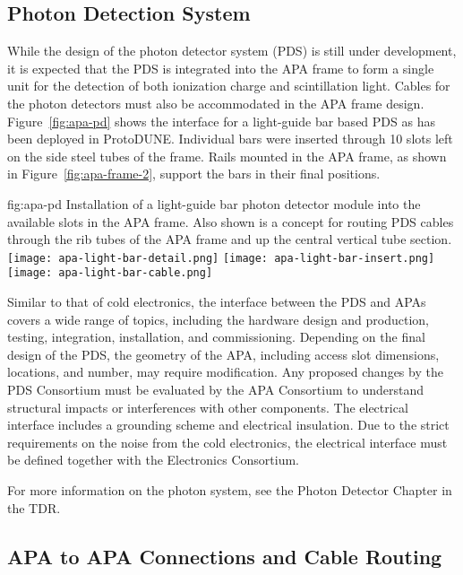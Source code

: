 \subsection{Photon Detection System}
\label{sec:fdsp-apa-intfc-pds}

While the design of the photon detector system (PDS) is still under development, it is expected that the PDS is integrated into the APA frame to form a single unit for the detection of both ionization charge and scintillation light.  Cables for the photon detectors must also be accommodated in the APA frame design.  Figure~\ref{fig:apa-pd} shows the interface for a light-guide bar based PDS as has been deployed in ProtoDUNE. Individual bars were inserted through 10 slots left on the side steel tubes of the frame. Rails mounted in the APA frame, as shown in Figure~\ref{fig:apa-frame-2}, support the bars in their final positions. 

\begin{dunefigure}{fig:apa-pd}
{Installation of a light-guide bar photon detector module into the available slots in the APA frame. Also shown is a concept for routing PDS cables through the rib tubes of the APA frame and up the central vertical tube section.}
\texttt{[image: apa-light-bar-detail.png]}\qquad\qquad
\texttt{[image: apa-light-bar-insert.png]}\qquad\qquad
\texttt{[image: apa-light-bar-cable.png]}
\end{dunefigure}

Similar to that of cold electronics, the interface between the PDS and APAs covers a wide range of topics, including the hardware design and production, testing, integration, installation, and commissioning. Depending on the final design of the PDS, the geometry of the APA, including access slot dimensions, locations, and number, may require modification. Any proposed changes by the PDS Consortium must be evaluated by the APA Consortium to understand structural impacts or interferences with other components.  The electrical interface includes a grounding scheme and electrical insulation. Due to the strict requirements on the noise from the cold electronics, the electrical interface must be defined together with the Electronics Consortium. 

For more information on the photon system, see the Photon Detector Chapter in the TDR.


\subsection{APA to APA Connections and Cable Routing}
\label{sec:fdsp-apa-intfc-apa}

